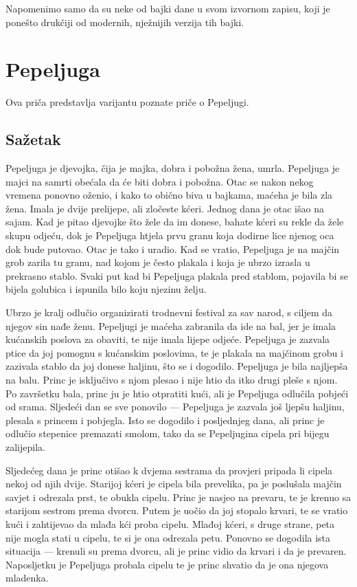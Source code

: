 \documentclass[a4paper,twoside,12pt]{memoir} %
\begin{document}
		Napomenimo samo da su neke od bajki dane u svom izvornom zapisu, koji je ponešto drukčiji od modernih, nježnijih verzija tih bajki.

	\section{Pepeljuga}

		Ova priča predstavlja varijantu poznate priče o Pepeljugi.

		\subsection{Sažetak}

		Pepeljuga je djevojka, čija je majka, dobra i pobožna žena, umrla. Pepeljuga je majci na samrti obećala da će biti dobra i pobožna. Otac se nakon nekog vremena ponovno oženio, i kako to obično biva u bajkama, maćeha je bila zla žena. Imala je dvije prelijepe, ali zločeste kćeri. Jednog dana je otac išao na sajam. Kad je pitao djevojke što žele da im donese, bahate kćeri su rekle da žele skupu odjeću, dok je Pepeljuga htjela prvu granu koja dodirne lice njenog oca dok bude putovao. Otac je tako i uradio. Kad se vratio, Pepeljuga je na majčin grob zarila tu granu, nad kojom je često plakala i koja je ubrzo izrasla u prekrasno stablo. Svaki put kad bi Pepeljuga plakala pred stablom, pojavila bi se bijela golubica i ispunila bilo koju njezinu želju.

		Ubrzo je kralj odlučio organizirati trodnevni festival za sav narod, s ciljem da njegov sin nađe ženu. Pepeljugi je maćeha zabranila da ide na bal, jer je imala kućanskih poslova za obaviti, te nije imala lijepe odjeće. Pepeljuga je zazvala ptice da joj pomognu s kućanskim poslovima, te je plakala na majčinom grobu i zazivala stablo da joj donese haljinu, što se i dogodilo. Pepeljuga je bila najljepša na balu. Princ je isključivo s njom plesao i nije htio da itko drugi pleše s njom. Po završetku bala, princ ju je htio otpratiti kući, ali je Pepeljuga odlučila pobjeći od srama. Sljedeći dan se sve ponovilo --- Pepeljuga je zazvala još ljepšu haljinu, plesala s princem i pobjegla. Isto se dogodilo i posljednjeg dana, ali princ je odlučio stepenice premazati smolom, tako da se Pepeljugina cipela pri bijegu zalijepila.

		Sljedećeg dana je princ otišao k dvjema sestrama da provjeri pripada li cipela nekoj od njih dvije. Starijoj kćeri je cipela bila prevelika, pa je poslušala majčin savjet i odrezala prst, te obukla cipelu. Princ je nasjeo na prevaru, te je krenuo sa starijom sestrom prema dvorcu. Putem je uočio da joj stopalo krvari, te se vratio kući i zahtijevao da mlađa kći proba cipelu. Mlađoj kćeri, s druge strane, peta nije mogla stati u cipelu, te si je ona odrezala petu. Ponovno se dogodila ista situacija --- krenuli su prema dvorcu, ali je princ vidio da krvari i da je prevaren. Naposljetku je Pepeljuga probala cipelu te je princ shvatio da je ona njegova mladenka.
\end{document}
